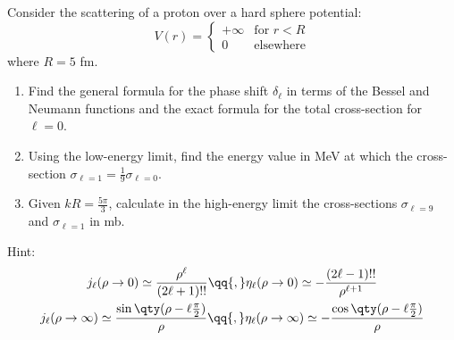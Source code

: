 \begin{esercizio}
   Consider the scattering of a proton over a hard sphere potential:
   \begin{equation*}
      V(r) =
      \begin{cases}
         +\infty & \text{for } r < R \\
         0 & \text{elsewhere}
      \end{cases}
   \end{equation*}
   where $R = 5$ fm.
   \begin{enumerate}[label=\alph*), leftmargin=0.6cm]
      \item Find the general formula for the phase shift $\delta_{\ell}$ in terms of the Bessel and Neumann functions and the exact formula for the total cross-section for $\ell=0$.
      \item Using the low-energy limit, find the energy value in MeV at which the cross-section $\sigma_{\ell=1}=\frac{1}{9} \sigma_{\ell=0}$.
      \item Given $ kR=\frac{5\pi}{3}$, calculate in the high-energy limit the cross-sections $\sigma_{\ell=9}$ and $\sigma_{\ell=1}$ in mb.
   \end{enumerate}
   Hint:
   \begin{gather*}
      j_{\ell}(\rho \to 0)
      \simeq \frac{\rho^{\ell}}{(2\ell + 1)!!}
      \qq{,}
      \eta_{\ell}(\rho \to 0)
      \simeq -\frac{(2\ell - 1)!!}{\rho^{\ell+1}}
      \\
      j_{\ell}(\rho \to \infty)
      \simeq \frac{\sin{ \qty( \rho - \ell \frac{\pi}{2} ) }}{\rho}
      \qq{,}
      \eta_{\ell}(\rho \to \infty)
      \simeq -\frac{\cos{ \qty( \rho - \ell \frac{\pi}{2} ) }}{\rho}
   \end{gather*}
\end{esercizio}